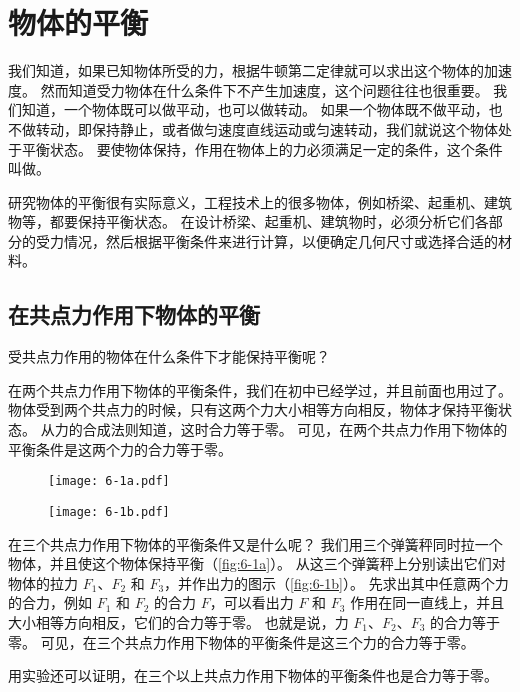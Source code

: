 \chapter{物体的平衡}
我们知道，如果已知物体所受的力，根据牛顿第二定律就可以求出这个物体的加速度。
然而知道受力物体在什么条件下不产生加速度，这个问题往往也很重要。
我们知道，一个物体既可以做平动，也可以做转动。
如果一个物体既不做平动，也不做转动，即保持静止，或者做匀速度直线运动或匀速转动，我们就说这个物体处于平衡状态。
要使物体保持，作用在物体上的力必须满足一定的条件，这个条件叫做。

研究物体的平衡很有实际意义，工程技术上的很多物体，例如桥梁、起重机、建筑物等，都要保持平衡状态。
在设计桥梁、起重机、建筑物时，必须分析它们各部分的受力情况，然后根据平衡条件来进行计算，以便确定几何尺寸或选择合适的材料。

\section{在共点力作用下物体的平衡}
受共点力作用的物体在什么条件下才能保持平衡呢？

在两个共点力作用下物体的平衡条件，我们在初中已经学过，并且前面也用过了。
物体受到两个共点力的时候，只有这两个力大小相等方向相反，物体才保持平衡状态。
从力的合成法则知道，这时合力等于零。
可见，在两个共点力作用下物体的平衡条件是这两个力的合力等于零。
\begin{figure}
  \begin{minipage}[b]{0.4\linewidth}\centering
    \texttt{[image: 6-1a.pdf]}
    \subcaption{}\label{fig:6-1a}
  \end{minipage}
  \begin{minipage}[b]{0.2\linewidth}\centering
    \texttt{[image: 6-1b.pdf]}
    \subcaption{}\label{fig:6-1b}
  \end{minipage}
  \caption{}\label{fig:6-1}
\end{figure}

在三个共点力作用下物体的平衡条件又是什么呢？
我们用三个弹簧秤同时拉一个物体，并且使这个物体保持平衡（\cref{fig:6-1a}）。
从这三个弹簧秤上分别读出它们对物体的拉力 $F_1$、$F_2$ 和 $F_3$，并作出力的图示（\cref{fig:6-1b}）。
先求出其中任意两个力的合力，例如 $F_1$ 和 $F_2$ 的合力 $F$，可以看出力 $F$ 和 $F_3$ 作用在同一直线上，并且大小相等方向相反，它们的合力等于零。
也就是说，力 $F_1$、$F_2$、$F_3$ 的合力等于零。
可见，在三个共点力作用下物体的平衡条件是这三个力的合力等于零。

用实验还可以证明，在三个以上共点力作用下物体的平衡条件也是合力等于零。

